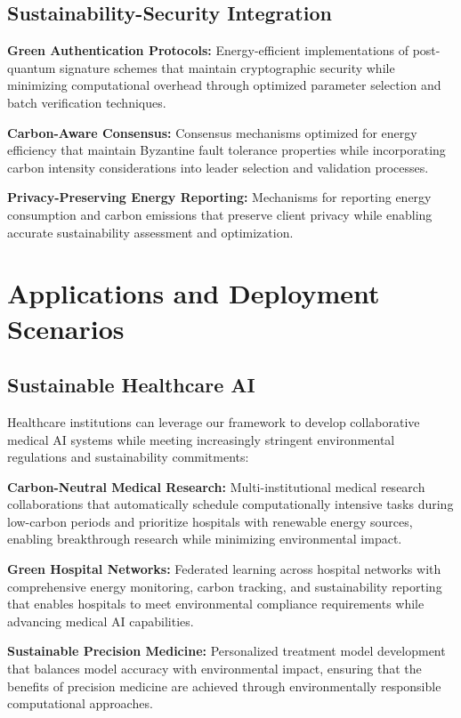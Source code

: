 \documentclass[10pt,journal,compsoc]{IEEEtran}
\begin{document}
\subsection{Sustainability-Security Integration}

\textbf{Green Authentication Protocols:} Energy-efficient implementations of post-quantum signature schemes that maintain cryptographic security while minimizing computational overhead through optimized parameter selection and batch verification techniques.

\textbf{Carbon-Aware Consensus:} Consensus mechanisms optimized for energy efficiency that maintain Byzantine fault tolerance properties while incorporating carbon intensity considerations into leader selection and validation processes.

\textbf{Privacy-Preserving Energy Reporting:} Mechanisms for reporting energy consumption and carbon emissions that preserve client privacy while enabling accurate sustainability assessment and optimization.

\section{Applications and Deployment Scenarios}

\subsection{Sustainable Healthcare AI}

Healthcare institutions can leverage our framework to develop collaborative medical AI systems while meeting increasingly stringent environmental regulations and sustainability commitments:

\textbf{Carbon-Neutral Medical Research:} Multi-institutional medical research collaborations that automatically schedule computationally intensive tasks during low-carbon periods and prioritize hospitals with renewable energy sources, enabling breakthrough research while minimizing environmental impact.

\textbf{Green Hospital Networks:} Federated learning across hospital networks with comprehensive energy monitoring, carbon tracking, and sustainability reporting that enables hospitals to meet environmental compliance requirements while advancing medical AI capabilities.

\textbf{Sustainable Precision Medicine:} Personalized treatment model development that balances model accuracy with environmental impact, ensuring that the benefits of precision medicine are achieved through environmentally responsible computational approaches.
\end{document}
